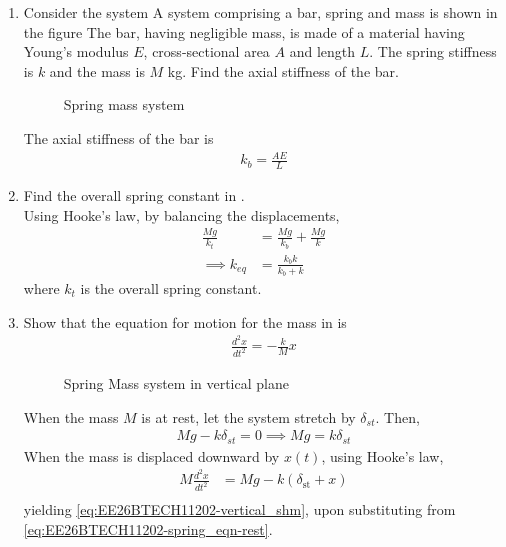 \begin{enumerate}[label=\thesubsection.\arabic*, ref=\thesubsection.\theenumi]
Substituting \eqref{eq:EE26BTECH11202-energy} into \eqref{eq:EE26BTECH11202-ecc_energy_sub} yields:
\begin{align}
e^2 = 1 + \frac{2\varepsilon h^2}{\mu^2}
\end{align}
\item 
	Consider the system 
	A system comprising a bar, spring and mass is shown in the figure 
	 The bar, having negligible mass, is made of a material having Young’s modulus $E$, cross-sectional area $A$ and length $L$.   The spring stiffness is $k$ and the mass is $M$ kg. 
Find the axial stiffness of the bar.
\begin{figure}[H]
\begin{center}
	
\caption{Spring mass system}
\label{fig:EE26BTECH11202-11}
\end{center}
\end{figure}
\solution 
The axial stiffness of the bar is
\begin{align}
\label{fig:EE26BTECH11202-11-stiffness}
k_{b} = \frac{AE}{L}
\end{align}
\item Find the overall spring constant in
.
\\
\solution Using Hooke's law, by balancing the displacements,
\begin{align}
	\frac{Mg}{k_{t}}
	&=
	\frac{Mg}{k_{b}}
	+\frac{Mg}{k}
	\\
	\implies k_{{eq}} &= \frac{k_{b} k}{k_{b} + k}
\label{eq:EE26BTECH11202-springs_series}
\end{align}
where $k_t$ is the overall spring constant. 
\item 
Show that the equation for motion for the mass in 
     is
\begin{align}
	\frac{d^2 x}{d t^2} = -\frac{k}{M}x 
	\label{eq:EE26BTECH11202-vertical_shm}
\end{align}
\begin{figure}[H]
\begin{center}

    \caption{Spring Mass system in vertical plane}
    \label{fig:EE26BTECH11202-2_}

\end{center}
\end{figure}
\solution 
When the mass $M$ is at rest, let the system stretch by $\delta_{{st}}$.%
Then, 
\begin{align}
Mg - k\delta_{{st}} = 0 \implies Mg = k\delta_{{st}}
\label{eq:EE26BTECH11202-spring_eqn-rest}
\end{align}
When the mass is displaced downward by $x(t)$, using Hooke's law,
\begin{align}
M \frac{d^2 x}{d t^2} &= M g - k(\delta_{\text{st}} + x) \\
\label{eq:EE26BTECH11202-spring_eqn}
\end{align}
	yielding \eqref{eq:EE26BTECH11202-vertical_shm},
upon substituting from \eqref{eq:EE26BTECH11202-spring_eqn-rest}.
\end{enumerate}
